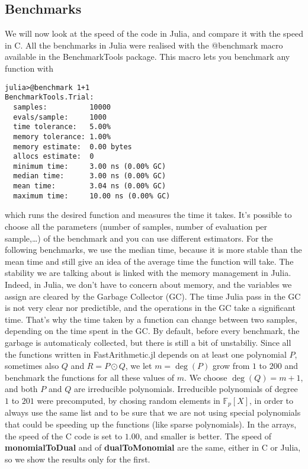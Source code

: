 \documentclass[a4paper,11pt]{article}
\theoremstyle{break}
\theoremstyle{definition}
\theoremstyle{remark}
\begin{document}
\subsection{Benchmarks}
We will now look at the speed of the code in Julia, and compare it with
the speed in C. All the benchmarks in Julia were realised with the
@benchmark macro available in the BenchmarkTools package. This macro lets you
benchmark any function with 

\begin{verbatim}
julia>@benchmark 1+1
BenchmarkTools.Trial: 
  samples:          10000
  evals/sample:     1000
  time tolerance:   5.00%
  memory tolerance: 1.00%
  memory estimate:  0.00 bytes
  allocs estimate:  0
  minimum time:     3.00 ns (0.00% GC)
  median time:      3.00 ns (0.00% GC)
  mean time:        3.04 ns (0.00% GC)
  maximum time:     10.00 ns (0.00% GC)
\end{verbatim}
which runs the desired function and measures the time it takes. It's possible
to choose all the parameters (number of samples, number of evaluation
per sample,\dots) of the benchmark and you can use different
estimators. For the following benchmarks, we use the median time, because it
is more stable than the mean time and still give an idea of the average time
the function will take. The stability we are talking about is linked with the
memory management in Julia. Indeed, in Julia, we don't have to concern about
memory, and the variables we assign are cleared by the Garbage Collector
(GC). The time Julia pass in the GC is not very clear nor predictible, and the
operations in the GC take a significant time. That's why the time taken by a
function can change between two samples, depending on the time spent in the GC.
By default, before every benchmark, the garbage is automaticaly collected, but
there is still a bit of unstabiliy.
Since all the functions written in FastArithmetic.jl depends on at least one
polynomial $P$, sometimes also $Q$ and $R=P\odot Q$, we let $m=\deg (P)$ grow
from $1$ to $200$ and benchmark the functions for all these values of $m$. We
choose $\deg (Q)=m+1$, and both $P$ and $Q$ are irreducible polynomials.
Irreducible polynomials of degree $1$ to $201$ were precomputed, by chosing
random elements in $\mathbb{F}_{p}[X]$, in order to
always use the same list and to be sure that we are not using special
polynomials that could be speeding up the functions (like sparse
polynomials). In the arrays, the speed of
the C code is set to $1.00$, and smaller is better. The speed of 
\textbf{monomialToDual} and of \textbf{dualToMonomial} are the same, either in C
or Julia, so we show the results only for the first.
\end{document}
